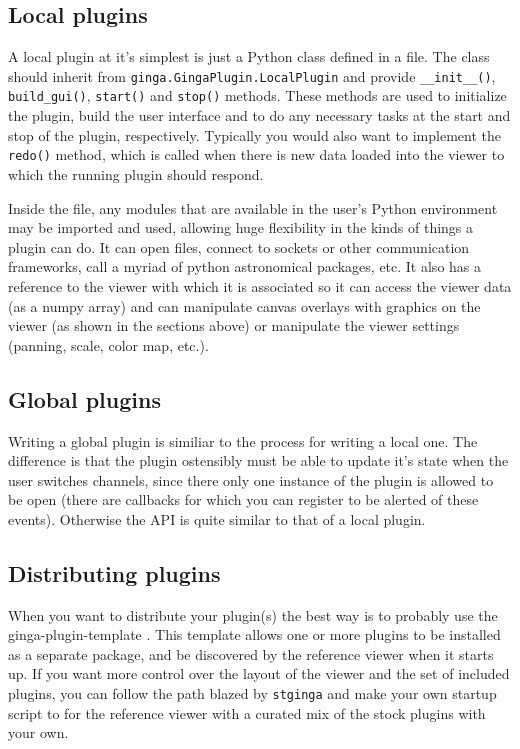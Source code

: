 \documentclass[]{article}
\begin{document}
\begin{multicols}{3}
\subsection*{Local plugins}
A local plugin at it's simplest is just a Python class defined in a file.
The class should inherit from {\tt ginga.GingaPlugin.LocalPlugin}
and provide {\tt \_\_init\_\_()}, {\tt build\_gui()}, {\tt start()}
and {\tt stop()} methods.  These methods are used to initialize the
plugin, build the user interface and to do any necessary tasks at the
start and stop of the plugin, respectively. Typically you would also
want to implement the {\tt redo()} method, which is called when there is
new data loaded into the viewer to which the running plugin should respond.

Inside the file, any modules that are available in the user's Python
environment may be imported and used, allowing huge flexibility in
the kinds of things a plugin can do.  It can open files, connect to
sockets or other communication frameworks, call a myriad of python
astronomical packages, etc.  It also has a reference to the viewer with
which it is associated so it can access the viewer data (as a numpy array)
and can manipulate canvas overlays with graphics on the viewer (as shown
in the sections above) or manipulate the viewer settings (panning,
scale, color map, etc.).

\subsection*{Global plugins}
Writing a global plugin is similiar to the process for writing a local
one.  The difference is that the plugin ostensibly must be able to
update it's state when the user switches channels, since there only
one instance of the plugin is allowed to be open (there are callbacks
for which you can register to be alerted of these events).  Otherwise
the API is quite similar to that of a local plugin.

\subsection*{Distributing plugins}
When you want to distribute your plugin(s) the best way is to probably use
the ginga-plugin-template \cite{plugin-template}.  This template allows one
or more plugins to be installed as a separate package, and be
discovered by the reference viewer when it starts up.  If you want
more control over the layout of the viewer and the set of included
plugins, you can follow the path blazed by {\tt stginga} and make your own
startup script to for the reference viewer with a curated mix of the
stock plugins with your own.


\end{multicols}
\end{document}
